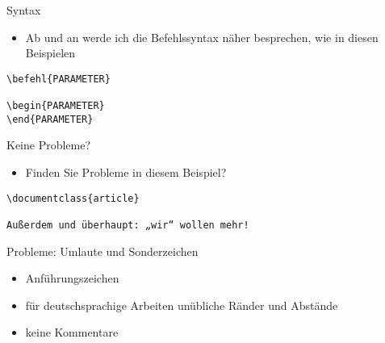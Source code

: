 \begin{frame}[fragile]{Syntax}

\begin{itemize}
\itemsep1pt\parskip0pt
\item
    Ab und an werde ich die Befehlssyntax näher besprechen, wie in diesen
    Beispielen
\end{itemize}

\begin{verbatim}
\befehl{PARAMETER}

\begin{PARAMETER}
\end{PARAMETER}
\end{verbatim}

\end{frame}

\begin{frame}[fragile]{Keine Probleme?}

\begin{itemize}
\itemsep1pt\parskip0pt
\item
  Finden Sie Probleme in diesem Beispiel?
\end{itemize}

\begin{verbatim}
\documentclass{article}

Außerdem und überhaupt: „wir“ wollen mehr!

\end{verbatim}

\end{frame}

\begin{frame}{Probleme: Umlaute und Sonderzeichen}

\begin{itemize}
\itemsep1pt\parskip0pt
\item
  Anführungszeichen
\item
  für deutschsprachige Arbeiten unübliche Ränder und Abstände
\item
  keine Kommentare
\end{itemize}

\end{frame}
